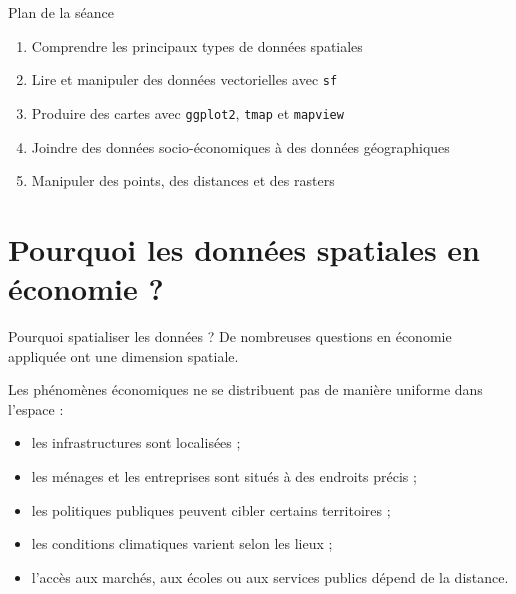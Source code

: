 \documentclass[
  10pt,
  ignorenonframetext,
]{beamer}
\providecommand{\tightlist}{%
  \setlength{\itemsep}{0pt}\setlength{\parskip}{0pt}}
\begin{document}
\begin{frame}[fragile]{Plan de la séance}
\label{plan-de-la-suxe9ance}
\begin{enumerate}
\tightlist
\item
  Comprendre les principaux types de données spatiales
\item
  Lire et manipuler des données vectorielles avec \texttt{sf}
\item
  Produire des cartes avec \texttt{ggplot2}, \texttt{tmap} et
  \texttt{mapview}
\item
  Joindre des données socio-économiques à des données géographiques
\item
  Manipuler des points, des distances et des rasters
\end{enumerate}
\end{frame}

\section{Pourquoi les données spatiales en économie
?}\label{pourquoi-les-donnuxe9es-spatiales-en-uxe9conomie}

\begin{frame}{Pourquoi spatialiser les données ?}
\label{pourquoi-spatialiser-les-donnuxe9es-1}
De nombreuses questions en économie appliquée ont une dimension
spatiale.

Les phénomènes économiques ne se distribuent pas de manière uniforme
dans l'espace :

\begin{itemize}
  \item les infrastructures sont localisées ;
  \item les ménages et les entreprises sont situés à des endroits précis ;
  \item les politiques publiques peuvent cibler certains territoires ;
  \item les conditions climatiques varient selon les lieux ;
  \item l’accès aux marchés, aux écoles ou aux services publics dépend de la distance.
\end{itemize}
\end{frame}
\end{document}
